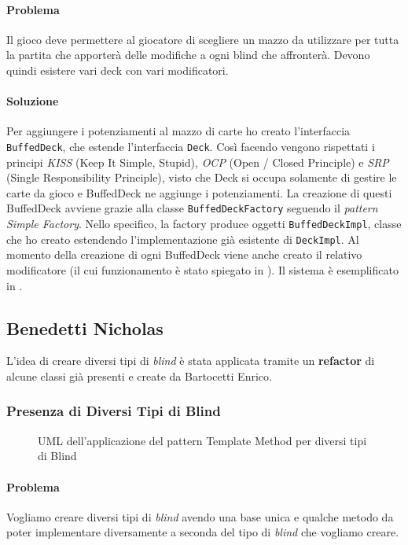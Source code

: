 \documentclass[a4paper,12pt]{report}
\begin{document}
\paragraph{Problema}
Il gioco deve permettere al giocatore di scegliere un mazzo da utilizzare per tutta la partita che apporterà delle modifiche a ogni blind che affronterà. Devono quindi esistere vari deck con vari modificatori.
\paragraph{Soluzione}
Per aggiungere i potenziamenti al mazzo di carte ho creato l’interfaccia  \texttt{BuffedDeck}, che estende l’interfaccia  \texttt{Deck}.
Così facendo vengono rispettati i principi \textit{KISS} (Keep It Simple, Stupid), \textit{OCP} (Open / Closed Principle) e \textit{SRP} (Single Responsibility Principle), visto che Deck si occupa solamente di gestire le carte da gioco e BuffedDeck ne aggiunge i potenziamenti.
La creazione di questi BuffedDeck avviene grazie alla classe  \texttt{BuffedDeckFactory} seguendo il \textit{pattern Simple Factory}.
Nello specifico, la factory produce oggetti \texttt{BuffedDeckImpl}, classe che ho creato estendendo l'implementazione già esistente di \texttt{DeckImpl}.
Al momento della creazione di ogni BuffedDeck viene anche creato il relativo modificatore (il cui funzionamento è stato spiegato in ).
Il sistema è esemplificato in .

\subsection{Benedetti Nicholas}
L'idea di creare diversi tipi di \textit{blind} è stata applicata tramite un \textbf{refactor} di alcune classi già presenti e create da Bartocetti Enrico.

\subsubsection*{Presenza di Diversi Tipi di Blind}

\begin{figure}[H]
	\centering{}
	
	\caption{UML dell'applicazione del pattern Template Method per diversi tipi di Blind}
	\label{img:differentblind}
\end{figure}

\paragraph{Problema}
Vogliamo creare diversi tipi di \textit{blind} avendo una base unica e qualche metodo da poter implementare diversamente a seconda del tipo di \textit{blind} che vogliamo creare.
\end{document}
